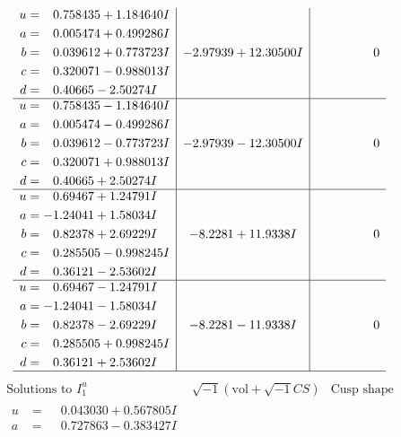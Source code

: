\documentclass[1p]{elsarticle_modified}
\theoremstyle{definition}
\newcommand{\I}{\sqrt{-1}}
\begin{document}
$$\begin{array}{c|c|c}
\begin{aligned}
u &= \phantom{-}0.758435 + 1.184640 I \\
a &= \phantom{-}0.005474 + 0.499286 I \\
b &= \phantom{-}0.039612 + 0.773723 I \\
c &= \phantom{-}0.320071 - 0.988013 I \\
d &= \phantom{-}0.40665 - 2.50274 I\end{aligned}
 & -2.97939 + 12.30500 I & \phantom{-0.000000 } 0 \\ \hline\begin{aligned}
u &= \phantom{-}0.758435 - 1.184640 I \\
a &= \phantom{-}0.005474 - 0.499286 I \\
b &= \phantom{-}0.039612 - 0.773723 I \\
c &= \phantom{-}0.320071 + 0.988013 I \\
d &= \phantom{-}0.40665 + 2.50274 I\end{aligned}
 & -2.97939 - 12.30500 I & \phantom{-0.000000 } 0 \\ \hline\begin{aligned}
u &= \phantom{-}0.69467 + 1.24791 I \\
a &= -1.24041 + 1.58034 I \\
b &= \phantom{-}0.82378 + 2.69229 I \\
c &= \phantom{-}0.285505 - 0.998245 I \\
d &= \phantom{-}0.36121 - 2.53602 I\end{aligned}
 & -8.2281 + 11.9338 I & \phantom{-0.000000 } 0 \\ \hline\begin{aligned}
u &= \phantom{-}0.69467 - 1.24791 I \\
a &= -1.24041 - 1.58034 I \\
b &= \phantom{-}0.82378 - 2.69229 I \\
c &= \phantom{-}0.285505 + 0.998245 I \\
d &= \phantom{-}0.36121 + 2.53602 I\end{aligned}
 & -8.2281 - 11.9338 I & \phantom{-0.000000 } 0\\
 \hline 
 \end{array}$$\newpage$$\begin{array}{c|c|c}  
\text{Solutions to }I^u_{1}& \I (\text{vol} + \sqrt{-1}CS) & \text{Cusp shape}\\
 \hline 
\begin{aligned}
u &= \phantom{-}0.043030 + 0.567805 I \\
a &= \phantom{-}0.727863 - 0.383427 I \\

\end{aligned}
\end{array}$$
\end{document}
